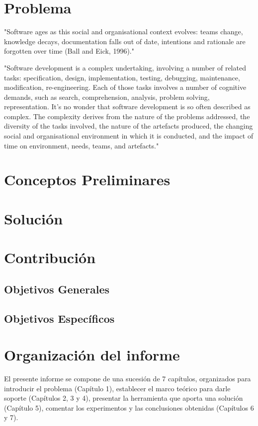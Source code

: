 \section{Problema}

"Software ages as this social and organisational context evolves: teams change,
knowledge decays, documentation falls out of date, intentions and rationale are forgotten over time
(Ball and Eick, 1996)."

"Software development is a complex undertaking, involving a number of related tasks: specification,
design, implementation, testing, debugging, maintenance, modification, re-engineering. Each of those
tasks involves a number of cognitive demands, such as search, comprehension, analysis, problem
solving, representation. It’s no wonder that software development is so often described as complex.
The complexity derives from the nature of the problems addressed, the diversity of the tasks involved,
the nature of the artefacts produced, the changing social and organisational environment in which it is
conducted, and the impact of time on environment, needs, teams, and artefacts."\cite{PetreDeQuincey06}

\section{Conceptos Preliminares}

\section{Solución}

\section{Contribución}
\subsection{Objetivos Generales}
\subsection{Objetivos Específicos}

\section{Organización del informe}
El presente informe se compone de una sucesión de 7 capítulos, organizados para introducir
el problema (Capítulo 1), establecer el marco teórico para darle soporte (Capítulos 2, 3 y 4),
presentar la herramienta que aporta una solución (Capítulo 5), comentar los experimentos y
las conclusiones obtenidas (Capítulos 6 y 7).


